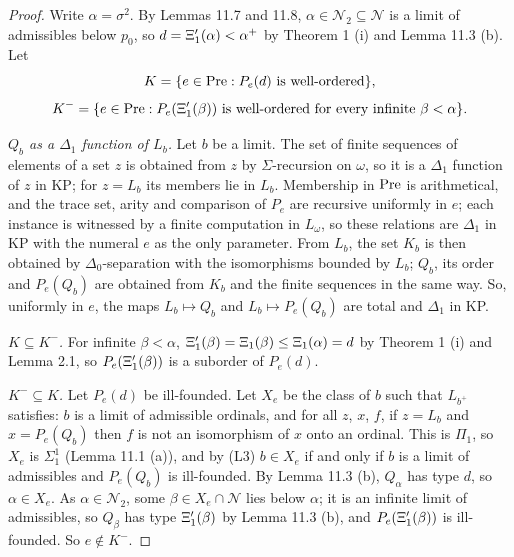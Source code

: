 \documentclass[11pt]{article}
\begin{document}
\begin{proof} Write $\alpha = \sigma^2$. By Lemmas 11.7 and 11.8, $\alpha \in \mathcal N_2 \subseteq \mathcal N$ is a
limit of admissibles below $p_0$, so $d = \Xi'_1(\alpha) < \alpha^+$ by Theorem 1 (i) and Lemma 11.3 (b). Let
\[ K = \{e \in \mathrm{Pre} : P_e(d) \text{ is well-ordered}\}, \]
\[ K^- = \{e \in \mathrm{Pre} : P_e(\Xi'_1(\beta)) \text{ is well-ordered for every infinite } \beta < \alpha\} . \]

\emph{$Q_b$ as a $\Delta_1$ function of $L_b$.} Let $b$ be a limit. The set of finite sequences of elements of a
set $z$ is obtained from $z$ by $\Sigma$-recursion on $\omega$, so it is a $\Delta_1$ function of $z$ in KP; for
$z = L_b$ its members lie in $L_b$. Membership in $\mathrm{Pre}$ is arithmetical, and the trace set, arity and comparison
of $P_e$ are recursive uniformly in $e$; each instance is witnessed by a finite computation in $L_{\omega}$, so
these relations are $\Delta_1$ in KP with the numeral $e$ as the only parameter. From $L_b$, the set $K_b$ is then
obtained by $\Delta_0$-separation with the isomorphisms bounded by $L_b$; $Q_b$, its order and $P_e(Q_b)$ are
obtained from $K_b$ and the finite sequences in the same way. So, uniformly in $e$, the maps
$L_b \mapsto Q_b$ and $L_b \mapsto P_e(Q_b)$ are total and $\Delta_1$ in KP.

\emph{$K \subseteq K^-$.} For infinite $\beta < \alpha$, $\Xi'_1(\beta) = \Xi_1(\beta) \le \Xi_1(\alpha) = d$ by Theorem 1
(i) and Lemma 2.1, so $P_e(\Xi'_1(\beta))$ is a suborder of $P_e(d)$.

\emph{$K^- \subseteq K$.} Let $P_e(d)$ be ill-founded. Let $X_e$ be the class of $b$ such that $L_{b^+}$ satisfies:
$b$ is a limit of admissible ordinals, and for all $z$, $x$, $f$, if $z = L_b$ and $x = P_e(Q_b)$ then $f$ is not
an isomorphism of $x$ onto an ordinal. This is $\Pi_1$, so $X_e$ is $\Sigma^1_1$ (Lemma 11.1 (a)), and by (L3)
$b \in X_e$ if and only if $b$ is a limit of admissibles and $P_e(Q_b)$ is ill-founded. By Lemma 11.3 (b),
$Q_{\alpha}$ has type $d$, so $\alpha \in X_e$. As $\alpha \in \mathcal N_2$, some $\beta \in X_e \cap \mathcal N$
lies below $\alpha$; it is an infinite limit of admissibles, so $Q_{\beta}$ has type $\Xi'_1(\beta)$ by Lemma 11.3 (b),
and $P_e(\Xi'_1(\beta))$ is ill-founded. So $e \notin K^-$.


\end{proof}
\end{document}
